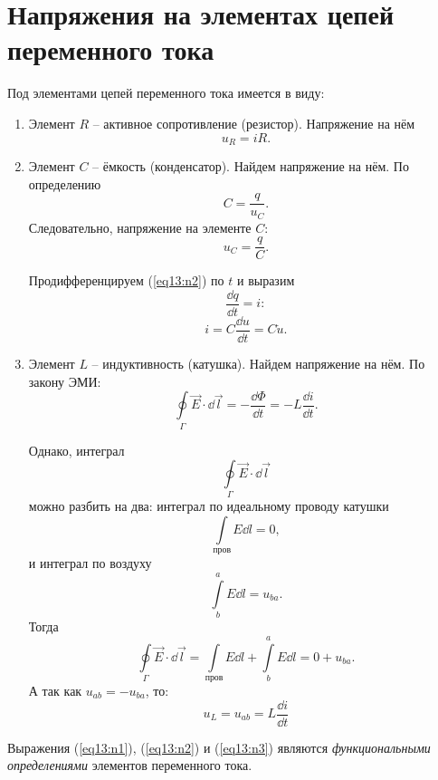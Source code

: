 \section{Напряжения на элементах цепей переменного тока}
    Под элементами цепей переменного тока имеется в виду:
    \begin{enumerate}
    \item Элемент \( R \) -- активное сопротивление (резистор).
        Напряжение на нём 
        \begin{equation}
            u_R = iR.
            \label{eq13:n1}
        \end{equation}

    \item Элемент \( C \) -- ёмкость (конденсатор).
        Найдем напряжение на нём. По определению
        \[
            C = \frac{q}{u_C}.
        \]
        Следовательно, напряжение на элементе \( C \):
        \begin{equation}
            u_C = \frac{q}{C}.
            \label{eq13:n2}
        \end{equation}

        Продифференцируем (\ref{eq13:n2}) по \( t \) и выразим
        \[
            \frac{\dd q}{\dd t} = i:
        \]
        \begin{equation}
            i = C\frac{\dd u}{\dd t} = C\dot{u}.
            \label{eq13:n2a}
        \end{equation}

    \item Элемент \( L \) -- индуктивность (катушка).
    Найдем напряжение на нём. По закону ЭМИ:
    \[
        \oint\limits_{\Gamma} \vec{E}\cdot\dd \vec{l} =
        -\frac{\dd \Phi}{\dd t} = -L\frac{\dd i}{\dd t}.
    \]

    Однако, интеграл
    \[
        \oint\limits_{\Gamma} \vec{E}\cdot\dd \vec{l}
    \]
    можно разбить на два: интеграл по идеальному проводу катушки
    \[
        \int\limits_{\textit{пров}} E \dd l = 0,
    \]
    и интеграл по воздуху
    \[
        \int\limits_b^a E\dd l = u_{ba}.
    \]
    Тогда
    \[
        \oint\limits_{\Gamma} \vec{E}\cdot\dd \vec{l} =
        \int\limits_{\textit{пров}} E \dd l +
        \int\limits_b^a E\dd l = 0 + u_{ba}.
    \]
    А так как \( u_{ab} = -u_{ba} \), то:
    \begin{equation}
        u_L = u_{ab} = L\frac{\dd i}{\dd t} \label{eq13:n3}
    \end{equation}

    \end{enumerate}
    Выражения (\ref{eq13:n1}), (\ref{eq13:n2}) и (\ref{eq13:n3}) являются 
    \textit{функциональными определениями} элементов переменного тока.

